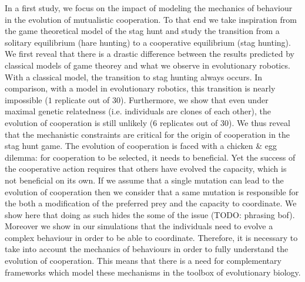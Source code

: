 		In a first study, we focus on the impact of modeling the mechanics of behaviour in the evolution of mutualistic cooperation. To that end we take inspiration from the game theoretical model of the stag hunt and study the transition from a solitary equilibrium (hare hunting) to a cooperative equilibrium (stag hunting). We first reveal that there is a drastic difference between the results predicted by classical models of game theorey and what we observe in evolutionary robotics. With a classical model, the transition to stag hunting always occurs. In comparison, with a model in evolutionary robotics, this transition is nearly impossible ($1$ replicate out of $30$). Furthermore, we show that even under maximal genetic relatedness (i.e. individuals are clones of each other), the evolution of cooperation is still unlikely ($6$ replicates out of $30$). We thus reveal that the mechanistic constraints are critical for the origin of cooperation in the stag hunt game. The evolution of cooperation is faced with a chicken \& egg dilemma: for cooperation to be selected, it needs to beneficial. Yet the success of the cooperative action requires that others have evolved the capacity, which is not beneficial on its own. If we assume that a single mutation can lead to the evolution of cooperation then we consider that a same mutation is responsible for the both a modification of the preferred prey and the capacity to coordinate. We show here that doing as such hides the some of the issue (TODO: phrasing bof). Moreover we show in our simulations that the individuals need to evolve a complex behaviour in order to be able to coordinate. Therefore, it is necessary to take into account the mechanics of behaviours in order to fully understand the evolution of cooperation. This means that there is a need for complementary frameworks which model these mechanisms in the toolbox of evolutionary biology.

